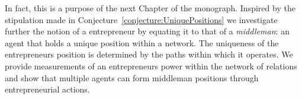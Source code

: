 In fact, this is a purpose of the next Chapter of the monograph. Inspired by the stipulation made in Conjecture~\ref{conjecture:UniquePositions} we investigate further the notion of a entrepreneur by equating it to that of a \emph{middleman}: an agent that holds a unique position within a network. The uniqueness of the entrepreneurs position is determined by the paths within which it operates. We provide measurements of an entrepreneurs power within the network of relations and show that multiple agents can form middleman positions through entrepreneurial actions.
